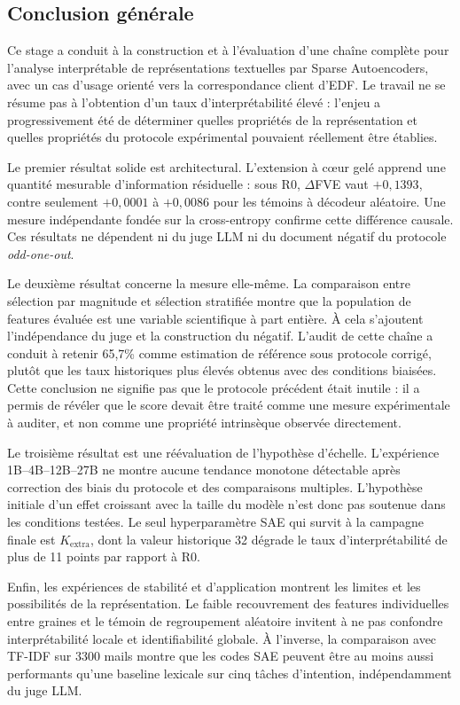 \documentclass[11pt]{article}
\begin{document}
\subsection{Conclusion générale}

Ce stage a conduit à la construction et à l'évaluation d'une chaîne complète pour
l'analyse interprétable de représentations textuelles par Sparse Autoencoders, avec
un cas d'usage orienté vers la correspondance client d'EDF. Le travail ne se résume
pas à l'obtention d'un taux d'interprétabilité élevé : l'enjeu a progressivement été
de déterminer quelles propriétés de la représentation et quelles propriétés du
protocole expérimental pouvaient réellement être établies.

Le premier résultat solide est architectural. L'extension à cœur gelé apprend une
quantité mesurable d'information résiduelle : sous R0, $\Delta$FVE vaut $+0{,}1393$,
contre seulement $+0{,}0001$ à $+0{,}0086$ pour les témoins à décodeur aléatoire. Une
mesure indépendante fondée sur la cross-entropy confirme cette différence causale.
Ces résultats ne dépendent ni du juge LLM ni du document négatif du protocole
\emph{odd-one-out}.

Le deuxième résultat concerne la mesure elle-même. La comparaison entre sélection par
magnitude et sélection stratifiée montre que la population de features évaluée est
une variable scientifique à part entière. À cela s'ajoutent l'indépendance du juge et
la construction du négatif. L'audit de cette chaîne a conduit à retenir 65,7\% comme
estimation de référence sous protocole corrigé, plutôt que les taux historiques plus
élevés obtenus avec des conditions biaisées. Cette conclusion ne signifie pas que le
protocole précédent était inutile : il a permis de révéler que le score devait être
traité comme une mesure expérimentale à auditer, et non comme une propriété intrinsèque
observée directement.

Le troisième résultat est une réévaluation de l'hypothèse d'échelle. L'expérience
1B--4B--12B--27B ne montre aucune tendance monotone détectable après correction des
biais du protocole et des comparaisons multiples. L'hypothèse initiale d'un effet
croissant avec la taille du modèle n'est donc pas soutenue dans les conditions testées.
Le seul hyperparamètre SAE qui survit à la campagne finale est $K_\text{extra}$, dont
la valeur historique 32 dégrade le taux d'interprétabilité de plus de 11 points par
rapport à R0.

Enfin, les expériences de stabilité et d'application montrent les limites et les
possibilités de la représentation. Le faible recouvrement des features individuelles
entre graines et le témoin de regroupement aléatoire invitent à ne pas confondre
interprétabilité locale et identifiabilité globale. À l'inverse, la comparaison avec
TF-IDF sur 3300 mails montre que les codes SAE peuvent être au moins aussi performants
qu'une baseline lexicale sur cinq tâches d'intention, indépendamment du juge LLM.
\end{document}
